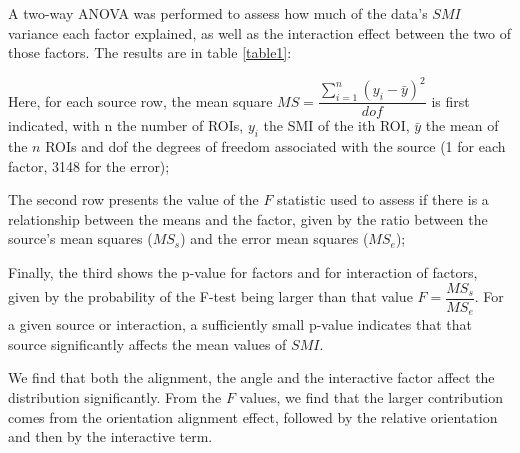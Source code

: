 A two-way ANOVA was performed to assess how much of the data's $SMI$ variance each factor explained, as well as the interaction effect between the two of those factors. The results are in table \ref{table1}: 

Here, for each source row, the mean square $MS=\dfrac{\sum_{i=1}^n(y_i-\bar{y})^2}{dof}$ is first indicated, with n the number of ROIs, $y_i$ the SMI of the ith ROI, $\bar{y}$ the mean of the $n$ ROIs and dof the degrees of freedom associated with the source (1 for each factor, 3148 for the error); 

The second row presents the value of the $F$ statistic used to assess if there is a relationship between the means and the factor, given by the ratio between the source's mean squares ($MS_s$) and the error mean squares ($MS_e$); 

Finally, the third shows the p-value for factors and for interaction of factors, given by the probability of the F-test being larger than that value $F=\dfrac{MS_s}{MS_e}$. For a given source or interaction, a sufficiently small p-value indicates that that source significantly affects the mean values of $SMI$. 

We find that both the alignment, the angle and the interactive factor affect the distribution significantly. From the $F$ values, we find that the larger contribution comes from the orientation alignment effect, followed by the relative orientation and then by the interactive term.

\begin{table}[H]
\begin{center}\par
{}
 \caption{Two-way ANOVA results for the collinear versus flanking surround effect and iso-oriented versus cross-oriented C-S effect, and interactions.}
    \vspace{-5mm}
    \label{table1}
\end{center}
\end{table}

